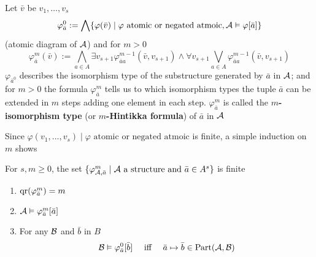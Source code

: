 \documentclass[11pt]{article}
\def \Part {\text{Part}}
\begin{document}
\begin{definition}[]
Let \(\bar{v}\) be \(v_1,\dots,v_s\)
\begin{equation*}
\varphi^0_{\bar{a}}:=\bigwedge
\{\varphi(\bar{v})\mid\varphi\text{ atomic or negated atmoic}, \mathcal{A}\vDash\varphi[\bar{a}]\}
\end{equation*}
(atomic diagram of \(\mathcal{A}\)) and for \(m>0\)
\begin{equation*}
\varphi_{\bar{a}}^m(\bar{v}):=
\bigwedge_{a\in A}\exists v_{s+1}\varphi_{\bar{a}a}^{m-1}(\bar{v},v_{s+1})\wedge
\forall v_{s+1}\bigvee_{a\in A}\varphi_{\bar{a}a}^{m-1}(\bar{v},v_{s+1})
\end{equation*}
\(\varphi_{\bar{a}^0}\) describes the isomorphism type of the substructure generated
by \(\bar{a}\) in \(\mathcal{A}\); and for \(m>0\) the formula \(\varphi_{\bar{a}}^m\) tells us to
which isomorphism types the tuple \(\bar{a}\) can be extended in \(m\) steps adding one element
in each step. \(\varphi_{\bar{a}}^m\) is called the \textbf{\(m\)-isomorphism type} (or \textbf{\(m\)-Hintikka
formula}) of \(\bar{a}\) in \(\mathcal{A}\)
\end{definition}

Since \(\varphi(v_1,\dots,v_s)\mid \varphi\text{ atomic or negated atmoic}\) is finite, a simple
induction on \(m\) shows

\begin{lemma}[]
For \(s,m\ge0\), the
set \(\{\varphi_{\mathcal{A},\bar{a}}^m\mid \mathcal{A}\text{ a structure and }\bar{a}\in A^s\}\) is finite
\end{lemma}

\begin{lemma}[]
\begin{enumerate}
\item \(\operatorname{qr}(\varphi_{\bar{a}}^m)=m\)
\item \(\mathcal{A}\vDash\varphi_{\bar{a}}^m[\bar{a}]\)
\item For any \(\mathcal{B}\) and \(\bar{b}\) in \(B\)
\begin{equation*}
\calb\vDash\varphi_{\bar{a}}^0[\bar{b}] \quad\text{ iff }\quad
\bar{a}\mapsto\bar{b}\in\Part(\cala,\calb)
\end{equation*}
\end{enumerate}
\end{lemma}
\end{document}
